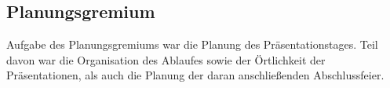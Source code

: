 \subsection{Planungsgremium}
Aufgabe des Planungsgremiums war die Planung des Präsentationstages. 
Teil davon war die Organisation des Ablaufes sowie der Örtlichkeit der Präsentationen, als auch die Planung der daran anschließenden Abschlussfeier. 

